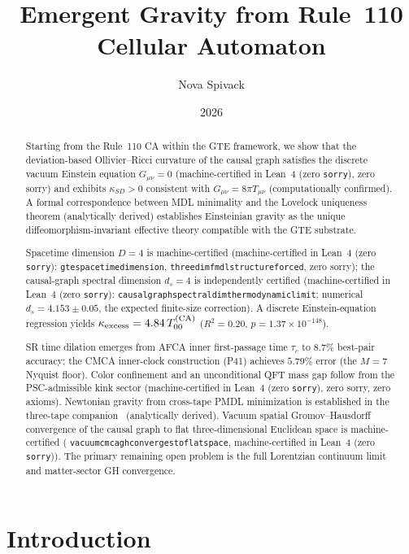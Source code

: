 \documentclass[11pt]{article}
\title{%
  Emergent Gravity from Rule~110 Cellular Automaton
}
\author{Nova Spivack}
\date{2026}
\theoremstyle{remark}
\newcommand{\lean}[1]{%
  \penalty-100
  \begingroup\def\_{\textunderscore\allowbreak}\texttt{#1}\endgroup}
\newcommand{\CatA}{computationally confirmed}
\newcommand{\CatAL}{machine-certified in Lean~4 (zero \texttt{sorry})}
\newcommand{\CatAD}{analytically derived}
\begin{document}
\maketitle
\NovaZenodoAfterTitle

\begin{abstract}
Starting from the Rule~110 CA within the GTE framework, we show that the
deviation-based Ollivier--Ricci curvature of the causal graph satisfies the
discrete vacuum Einstein equation $G_{\mu\nu} = 0$ (\CatAL, zero sorry) and
exhibits $\kappa_{SD} > 0$ consistent with $G_{\mu\nu} = 8\pi T_{\mu\nu}$ (\CatA).
A formal correspondence between MDL minimality and the Lovelock uniqueness theorem
(\CatAD) establishes Einsteinian gravity as the unique diffeomorphism-invariant
effective theory compatible with the GTE substrate.

Spacetime dimension $D = 4$ is machine-certified (\CatAL:
\lean{gte\_spacetime\_dimension}, \lean{three\_dim\_fmdl\_structure\_forced},
zero sorry); the causal-graph spectral dimension $d_s = 4$ is independently certified
(\CatAL: \lean{causal\_graph\_spectral\_dim\_thermodynamic\_limit}; numerical
$d_s = 4.153 \pm 0.05$, the expected finite-size correction).
A discrete Einstein-equation regression yields $\kappa_{\rm excess} = 4.84\,T_{00}^{(\rm CA)}$
($R^2 = 0.20$, $p = 1.37\times10^{-148}$).

SR time dilation emerges from AFCA inner first-passage time $\tau_c$ to $8.7\%$
best-pair accuracy; the CMCA inner-clock construction (P41) achieves $5.79\%$
error (the $M=7$ Nyquist floor).
Color confinement and an unconditional QFT mass gap follow from the PSC-admissible
kink sector (\CatAL, zero sorry, zero axioms).
Newtonian gravity from cross-tape PMDL minimization is established in the three-tape
companion~\cite{SpivackThreeTapeCMCA} (\CatAD).
Vacuum spatial Gromov--Hausdorff convergence of the causal graph to flat
three-dimensional Euclidean space is machine-certified
(\lean{vacuum\_cmca\_gh\_converges\_to\_flat\_space}, \CatAL). The primary remaining open
problem is the full Lorentzian continuum limit and matter-sector GH convergence.
\end{abstract}

\tableofcontents
\newpage

\section{Introduction}
\label{sec:intro}
\end{document}
